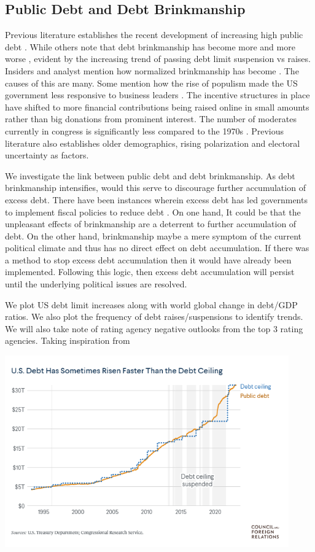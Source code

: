 \documentclass[
  12pt]{article}
\begin{document}
\hypertarget{public-debt-and-debt-brinkmanship}{%
\subsection{Public Debt and Debt
Brinkmanship}\label{public-debt-and-debt-brinkmanship}}

Previous literature establishes the recent development of increasing
high public debt \citep[ ]{mitchener2023}. While others note that debt
brinkmanship has become more and more worse \citep{berman} , evident by
the increasing trend of passing debt limit suspension vs raises.
Insiders and analyst mention how normalized brinkmanship has become
\citep{bivens}. The causes of this are many. Some mention how the rise
of populism made the US government less responsive to business leaders
\citep{cook2023} . The incentive structures in place have shifted to
more financial contributions being raised online in small amounts rather
than big donations from prominent interest. The number of moderates
currently in congress is significantly less compared to the 1970s
\citep{desilver2022}. Previous literature also establishes older
demographics, rising polarization and electoral uncertainty as factors.

We investigate the link between public debt and debt brinkmanship. As
debt brinkmanship intensifies, would this serve to discourage further
accumulation of excess debt. There have been instances wherein excess
debt has led governments to implement fiscal policies to reduce debt
\citep{pfeil, yared2019}. On one hand, It could be that the unpleasant
effects of brinkmanship are a deterrent to further accumulation of debt.
On the other hand, brinkmanship maybe a mere symptom of the current
political climate and thus has no direct effect on debt accumulation. If
there was a method to stop excess debt accumulation then it would have
already been implemented. Following this logic, then excess debt
accumulation will persist until the underlying political issues are
resolved.

We plot US debt limit increases along with world global change in
debt/GDP ratios. We also plot the frequency of debt raises/suspensions
to identify trends. We will also take note of rating agency negative
outlooks from the top 3 rating agencies. Taking inspiration from

\includegraphics[width=4.8125in,height=\textheight]{style-guide/Debt plot.png}
\end{document}

